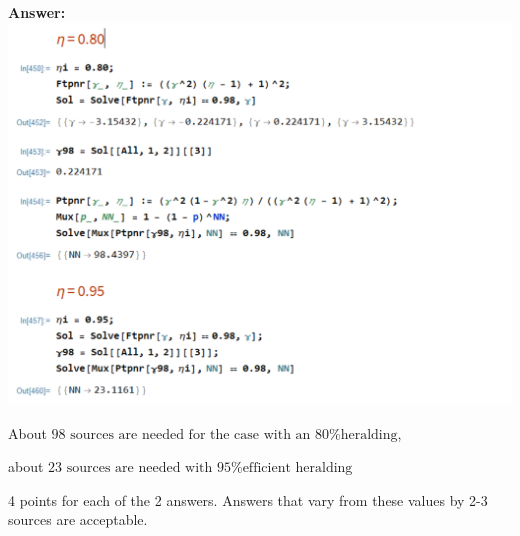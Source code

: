 \documentclass[12pt]{caltech_thesis}
\begin{document}
\begin{enumerate}
  {\color{midnightblue}  \textbf{Answer:} }
  {\color{midnightblue} \includegraphics{chapter_05/figs_05/pnrTotalPerf.PNG}}

  {\color{midnightblue} About
  \(\boxed{\text{98 sources are needed for the case with an 80\% heralding}}\),
  }

  {\color{midnightblue} about
  \(\boxed{\text{23 sources are needed with 95\% efficient heralding}}\)}

  {\color{darkred}  4 points for each of the 2 answers. Answers that
  vary from these values by 2-3 sources are acceptable. }
\end{enumerate}

\printbibliography
\end{document}
